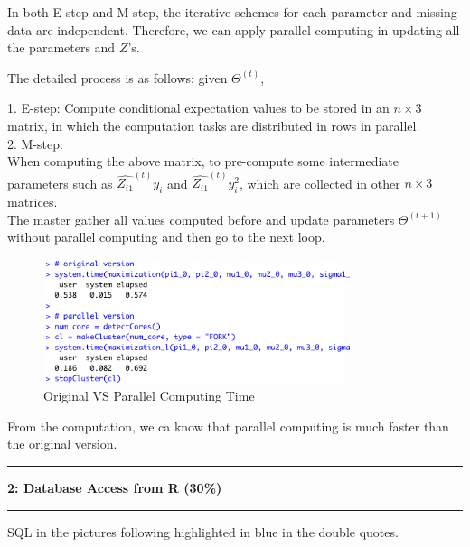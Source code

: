 \documentclass[11pt]{article}
\newcommand\question[2]{\vspace{.25in}\hrule\textbf{#1: #2}\vspace{.5em}\hrule\vspace{.10in}}
\begin{document}
In both E-step and M-step, the iterative schemes for each parameter and missing data are independent. Therefore, we can apply parallel computing 
in updating all the parameters and $Z$'s.

The detailed process is as follows: given $\Theta^{(t)}$,

1. E-step: Compute conditional expectation values to be stored in an $n \times 3$ matrix, in which the computation tasks are distributed in rows in parallel.\\
2. M-step: \\
When computing the above matrix, to pre-compute some intermediate parameters such as $\widehat{Z_{i1}}^{(t)} y_i$ and $\widehat{Z_{i1}}^{(t)} y_i^2$, which are collected in other $n \times 3$ matrices.\\
The master gather all values computed before and update parameters $\Theta^{(t+1)}$ without parallel computing and then go to the next loop.
\begin{figure}[H]
    \centering
    \includegraphics[width=0.8\textwidth]{figures/Q1.png}
    \caption{Original VS Parallel Computing Time}
\end{figure}
From the computation, we ca know that parallel computing is much faster than the original version. 

\question{2}{Database Access from R (30\%)}
SQL in the pictures following highlighted in blue in the double quotes.
\end{document}
